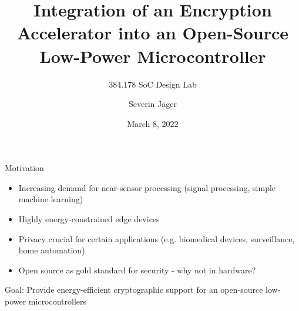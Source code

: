 \documentclass[aspectratio=169, nobackgroundmain]{beamer}
\title{Integration of an Encryption Accelerator
into an Open-Source Low-Power Microcontroller}
\subtitle{384.178 SoC Design Lab}
\author[Severin Jäger]{Severin Jäger}
\date{March 8, 2022}
\begin{document}
\begin{frame}
  \titlepage
\end{frame}


\begin{frame}[fragile]{Motivation}
  \begin{itemize}
    \item Increasing demand for near-sensor processing (signal processing, simple machine learning)
    \item Highly energy-constrained edge devices
    \item Privacy crucial for certain applications (e.g. biomedical devices, surveillance, home automation)
    \item Open source as gold standard for security - why not in hardware?
\end{itemize}

\begin{block}{}
    \centering
   Goal: Provide energy-efficient cryptographic support for an open-source low-power microcontrollers
\end{block}
\end{frame}
\end{document}
